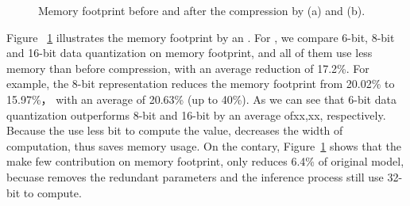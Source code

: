 \begin{figure}[!t]
\centering
{}
\hfill
{}
\hfill

\caption{Memory footprint before and after the compression by \quantization(a) and \pruning (b).}
\label{fig:footprint}
\end{figure}

Figure ~\ref{fig:footprint} illustrates the memory footprint by \quantization an \pruning.
For \quantization, we compare 6-bit, 8-bit and 16-bit data quantization on memory footprint, and 
all of them use less memory than before compression, with an average reduction of 17.2\%. 
For example, the 8-bit representation reduces the memory footprint from 20.02\% to 15.97\%， 
with an average of 20.63\% (up to 40\%). 
As we can see that 6-bit data quantization outperforms 8-bit and 16-bit by an average ofxx,xx,
respectively. Because the \quantization use less bit to compute the value, decreases the width of computation,
thus saves memory usage.
On the contary, Figure~\ref{fig:footprint} shows that the \pruning make few contribution on memory footprint, only reduces 6.4\% of original model,
becuase \pruning removes the redundant parameters and the inference process still use 32-bit to compute.



